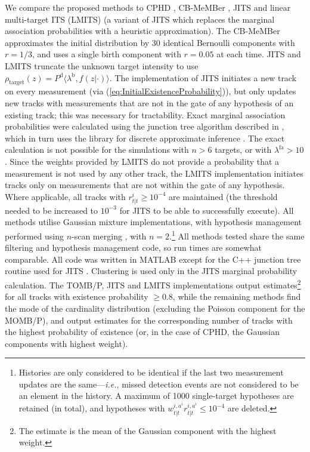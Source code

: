 \documentclass[journal,twoside]{IEEEtran}
\theoremstyle{plain}
\begin{document}
We compare the proposed methods to CPHD \cite{Mah07,VoVo07}, CB-MeMBer \cite{VoVo09}, JITS and linear multi-target ITS (LMITS) \cite{MusEva09,ChaMor11} (a variant of JITS which replaces the marginal association probabilities with a heuristic approximation). The CB-MeMBer approximates the initial distribution by 30 identical Bernoulli components with $r=1/3$, and uses a single birth component with $r=0.05$ at each time. JITS and LMITS truncate the unknown target intensity to use $\rho_{\textrm{target}}(z)=P^{\mathrm{d}}\langle\lambda^\mathrm{b},f(z|\cdot)\rangle$. The implementation of JITS initiates a new track on every measurement (via (\ref{eq:InitialExistenceProbability})), but only updates new tracks with measurements that are not in the gate of any hypothesis of an existing track; this was necessary for tractability. Exact marginal association probabilities were calculated using the junction tree algorithm described in \cite{WilLau12}, which in turn uses the library for discrete approximate inference \cite{libDAI}. The exact calculation is not possible for the simulations with $n>6$ targets, or with $\lambda^\mathrm{fa}>10$. Since the weights provided by LMITS do not provide a probability that a measurement is not used by any other track, the LMITS implementation initiates tracks only on measurements that are not within the gate of any hypothesis.  
Where applicable, all tracks with $r^i_{t|t}\geq 10^{-4}$ are maintained (the threshold needed to be increased to $10^{-3}$ for JITS to be able to successfully execute). All methods utilise Gaussian mixture implementations, with hypothesis management performed using $n$-scan merging \cite{SinSea74}, with $n=2$.\footnote{Histories are only considered to be identical if the last two measurement updates are the same---\textit{i.e.}\xspace, missed detection events are not considered to be an element in the history. A maximum of 1000 single-target hypotheses are retained (in total), and hypotheses with $w^{i,a^i}_{t|t}r^{i,a^i}_{t|t}\leq 10^{-4}$ are deleted.} All methods tested share the same filtering and hypothesis management code, so run times are somewhat comparable. All code was written in MATLAB except for the C++ junction tree routine used for JITS \cite{libDAI}. Clustering is used only in the JITS marginal probability calculation. The TOMB/P, JITS and LMITS implementations output estimates\footnote{The estimate is the mean of the Gaussian component with the highest weight.\label{fn:Estimate}} for all tracks with existence probability $\geq 0.8$, while the remaining methods find the mode of the cardinality distribution (excluding the Poisson component for the MOMB/P), and output estimates for the corresponding number of tracks with the highest probability of existence (or, in the case of CPHD, the Gaussian components with highest weight).
\end{document}
